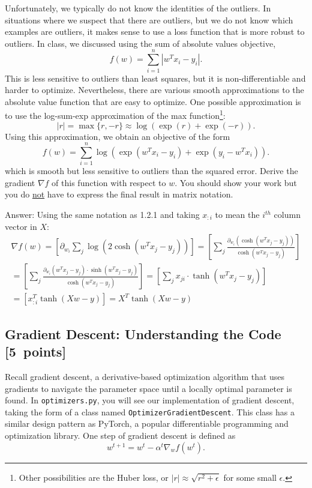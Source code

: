 \documentclass{article}
\newcommand{\blu}[1]{{\textcolor{blu}{#1}}}
\newenvironment{answer}{\par\begingroup\color{gre}Answer: }{\endgroup}
\let\ask\blu
\newcommand\pts[1]{\textcolor{pointscolour}{[#1~points]}}
\begin{document}
Unfortunately, we typically do not know the identities of the outliers. In situations where we suspect that there are outliers, but we do not know which examples are outliers, it makes sense to use a loss function that is more robust to outliers. In class, we discussed using the sum of absolute values objective,
\[
f(w) = \sum_{i=1}^n |w^Tx_i - y_i|.
\]
This is less sensitive to outliers than least squares, but it is non-differentiable and harder to optimize. Nevertheless, there are various smooth approximations to the absolute value function that are easy to optimize. One possible approximation is to use the log-sum-exp approximation of the max function\footnote{Other possibilities are the Huber loss, or $|r|\approx \sqrt{r^2+\epsilon}$ for some small $\epsilon$.}:
\[
|r| = \max\{r, -r\} \approx \log(\exp(r) + \exp(-r)).
\]
Using this approximation, we obtain an objective of the form
\[
f(w) {=} \sum_{i=1}^n  \log\left(\exp(w^Tx_i - y_i) + \exp(y_i - w^Tx_i)\right).
\]
which is smooth but less sensitive to outliers than the squared error. \ask{Derive
 the gradient $\nabla f$ of this function with respect to $w$. You should show your work but you do \underline{not} have to express the final result in matrix notation.}

\begin{answer}
    Using the same notation as 1.2.1 and taking $x_{:i}$ to mean the $i^{th}$ column vector in $X$:
    \begin{gather*}
        \nabla f(w) = \left[\partial_{w_i} \sum_j  \log\left(2 \cosh{\left(w^T x_j - y_j\right)}\right)\right]
        = \left[\sum_j \frac{\partial_{w_i} \left(\cosh{(w^T x_j - y_j)}\right)}{\cosh{\left(w^T x_j - y_j\right)}} \right]\\
        = \left[\sum_j \frac{\partial_{w_i} \left(w^T x_j - y_j\right)\cdot \sinh{(w^T x_j - y_j)}}{\cosh{\left(w^T x_j - y_j\right)}} \right]
        = \left[\sum_j x_{ji} \cdot \tanh{(w^T x_j - y_j)}\right]\\
        = \left[x^T_{:i} \tanh{(Xw - y)}\right] = X^T \tanh{(Xw - y)}
    \end{gather*}
\end{answer}

\subsection{Gradient Descent: Understanding the Code \pts{5}}

Recall gradient descent, a derivative-based optimization algorithm that uses gradients to navigate the parameter space until a locally optimal parameter is found. In \texttt{optimizers.py}, you will see our implementation of gradient descent, taking the form of a class named \texttt{OptimizerGradientDescent}. This class has a similar design pattern as PyTorch, a popular differentiable programming and optimization library. One step of gradient descent is defined as
\[
    w^{t+1} = w^t - \alpha^t \nabla_w f(w^t)
.\]
\end{document}
